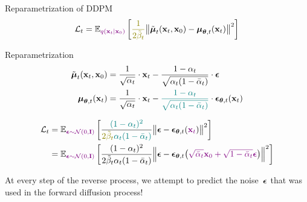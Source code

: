 \documentclass{beamer}
\renewcommand{\eqpause}{}
\renewcommand{\nextonslide}[1]{#1}
\begin{document}
\begin{frame}{Reparametrization of DDPM}
    \[
        \cL_t = \bbE_{\color{violet}q(\bx_t | \bx_0)} \left[ {\color{olive}\frac{1}{2\tilde{\beta}_t}} \bigl\| \tilde{\bmu}_t(\bx_t, \bx_0) - \bmu_{\btheta, t}(\bx_t) \bigr\|^2  \right]
    \]
    \vspace{-0.3cm}
    \begin{block}{Reparametrization}
        \vspace{-0.7cm}
        \begin{align*}
            \tilde{\bmu}_t(\bx_t, \bx_0) &= \frac{1}{\sqrt{\alpha_t}} \cdot \bx_t - \frac{1 - \alpha_t}{\sqrt{\alpha_t (1 - \bar{\alpha}_t)}} \cdot \bepsilon \\
            \nextonslide{\bmu_{\btheta, t}(\bx_t) &= \frac{1}{\sqrt{\alpha_t}} \cdot \bx_t - {\color{teal}\frac{1 - \alpha_t}{\sqrt{\alpha_t (1 - \bar{\alpha}_t)}}} \cdot \bepsilon_{\btheta, t}(\bx_t)}
        \end{align*}
        \vspace{-0.7cm}
    \end{block}
    \eqpause
    \vspace{-0.5cm}
    \begin{align*}
        \cL_t &=  \bbE_{\color{violet} \bepsilon \sim \cN(0, \bI)} \left[ \frac{{\color{teal}(1 - \alpha_t)^2}}{{\color{olive}2\tilde{\beta}_t} {\color{teal} \alpha_t (1 - \bar{\alpha}_t)}} \bigl\| \bepsilon - \bepsilon_{\btheta, t}({\color{violet}\bx_t}) \bigr\|^2 \right] \\
        \nextonslide{& =  \bbE_{\color{violet}\bepsilon \sim \cN(0, \bI)} \left[ \frac{(1 - \alpha_t)^2}{2\tilde{\beta}_t \alpha_t (1 - \bar{\alpha}_t)} \Bigl\| \bepsilon - \bepsilon_{\btheta, t}\bigl( {\color{violet}\sqrt{\bar{\alpha}_t} \bx_0 + \sqrt{1 - \bar{\alpha}_t} \bepsilon}\bigr) \Bigr\|^2 \right]}
    \end{align*}
    \eqpause
    At every step of the reverse process, we attempt to predict the noise~$\boldsymbol{\epsilon}$ that was used in the forward diffusion process!
\end{frame}
\end{document}
